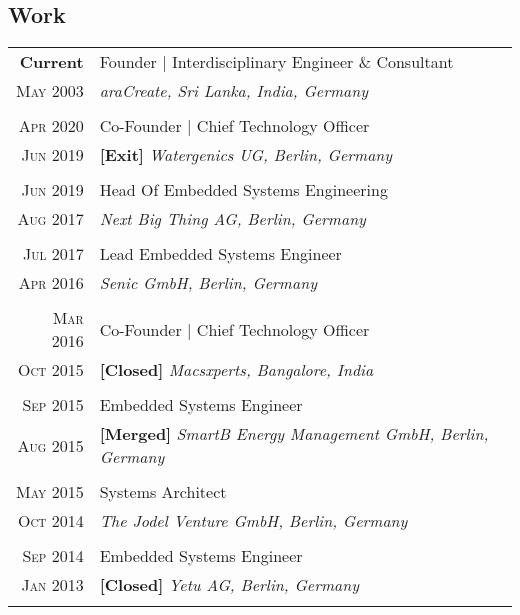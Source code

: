 \subsection{Work}
\begin{longtable}
	{r|p{12cm}}

	\textbf{Current} & Founder | Interdisciplinary Engineer \& Consultant\\
	\textsc{May 2003} &\emph{araCreate, Sri Lanka, India, Germany}\\
	\multicolumn{2}{c}{} \\

	\textsc{Apr 2020} & Co-Founder | Chief Technology Officer\\
	\textsc{Jun 2019}&\textbf{[Exit]} \emph{Watergenics UG, Berlin, Germany}\\
	\multicolumn{2}{c}{} \\

	\textsc{Jun 2019} & Head Of Embedded Systems Engineering\\
	\textsc{Aug 2017}&\emph{Next Big Thing AG, Berlin, Germany}\\
	\multicolumn{2}{c}{} \\

	\textsc{Jul 2017} & Lead Embedded Systems Engineer\\
	\textsc{Apr 2016}&\emph{Senic GmbH, Berlin, Germany}\\
	\multicolumn{2}{c}{} \\

	\textsc{Mar 2016} & Co-Founder | Chief Technology Officer\\
	\textsc{Oct 2015}&\textbf{[Closed]} \emph{Macsxperts, Bangalore, India}\\
	\multicolumn{2}{c}{} \\

	\textsc{Sep 2015} & Embedded Systems Engineer\\
	\textsc{Aug 2015}&\textbf{[Merged]} \emph{SmartB Energy Management GmbH, Berlin, Germany	}\\
	\multicolumn{2}{c}{} \\

	\textsc{May 2015} & Systems Architect\\
	\textsc{Oct 2014}&\emph{The Jodel Venture GmbH, Berlin, Germany	}\\
	\multicolumn{2}{c}{} \\

	\textsc{Sep 2014} & Embedded Systems Engineer\\
	\textsc{Jan 2013} &\textbf{[Closed]} \emph{Yetu AG, Berlin, Germany	}\\
	\multicolumn{2}{c}{} \\


\end{longtable}
